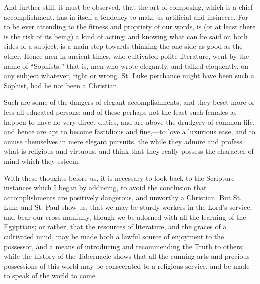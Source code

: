 And further still, it must be observed, that the art of composing,
which is a chief accomplishment, has in itself a tendency to make us
artificial and insincere. For to be ever attending to the fitness and
propriety of our words, is (or at least there is the risk of its being)
a kind of acting; and knowing what can be said on both sides of a
subject, is a main step towards thinking the one side as good as the
other. Hence men in ancient times, who cultivated polite literature,
went by the name of ``Sophists;'' that is, men who wrote
elegantly, and talked eloquently, on any subject whatever, right or
wrong. St. Luke perchance might have been such a Sophist, had he not
been a Christian.

Such are some of the dangers of elegant accomplishments; and they
beset more or less all educated persons; and of these perhaps not the
least such females as happen to have no very direct duties, and are
above the drudgery of common life, and hence are apt to become
fastidious and fine,—to love a luxurious ease, and to amuse themselves
in mere elegant pursuits, the while they admire and profess what is
religious and virtuous, and think that they really possess the character
of mind which they esteem.

With these thoughts before us, it is necessary to look back to the
Scripture instances which I began by adducing, to avoid the conclusion
that accomplishments are positively dangerous, and unworthy a Christian.
But St. Luke and St. Paul show us, that we may be sturdy workers in the
Lord's service, and bear our cross manfully, though we be adorned with
all the learning of the Egyptians; or rather, that the resources of
literature, and the graces of a cultivated mind, may be made both a
lawful source of enjoyment to the possessor, and a means of introducing
and recommending the Truth to others; while the history of the
Tabernacle shows that all the cunning arts and precious possessions of
this world may be consecrated to a religious service, and be made to
speak of the world to come.

